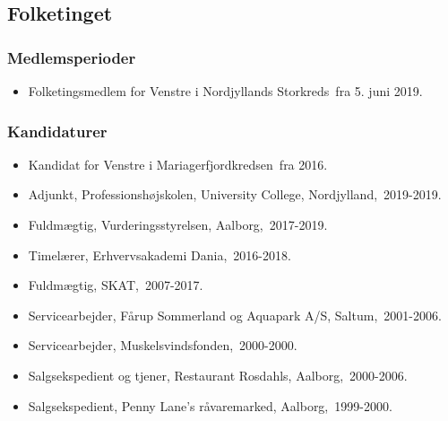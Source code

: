\documentclass[11pt, a4paper]{awesome-cv}
\begin{document}
\begin{cvletter}
\subsection*{Folketinget}
\subsubsection*{Medlemsperioder}
\begin{itemize}
\item Folketingsmedlem for Venstre i Nordjyllands Storkreds fra 5. juni 2019.
\end{itemize}
\subsubsection*{Kandidaturer}
\begin{itemize}
\item Kandidat for Venstre i Mariagerfjordkredsen fra 2016.
\end{itemize}
\begin{itemize}
\item Adjunkt, Professionshøjskolen, University College, Nordjylland, 2019-2019.
\item Fuldmægtig, Vurderingsstyrelsen, Aalborg, 2017-2019.
\item Timelærer, Erhvervsakademi Dania, 2016-2018.
\item Fuldmægtig, SKAT, 2007-2017.
\item Servicearbejder, Fårup Sommerland og Aquapark A/S, Saltum, 2001-2006.
\item Servicearbejder, Muskelsvindsfonden, 2000-2000.
\item Salgsekspedient og tjener, Restaurant Rosdahls, Aalborg, 2000-2006.
\item Salgsekspedient, Penny Lane's råvaremarked, Aalborg, 1999-2000.
\end{itemize}
\end{cvletter}
\end{document}
